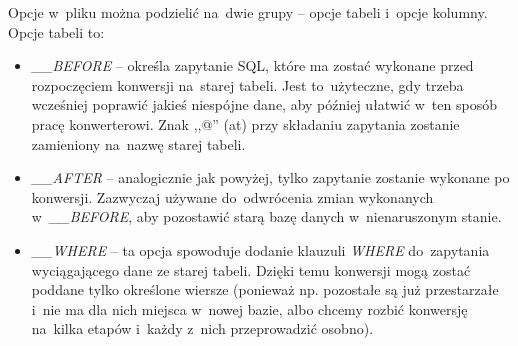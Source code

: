 \documentclass[a4paper,12pt,oneside]{report}
\begin{document}
Opcje w~pliku można podzielić na~dwie grupy -- opcje tabeli i~opcje kolumny. Opcje tabeli to:
\begin{itemize}
  \item \emph{\_\_BEFORE} -- określa zapytanie SQL, które ma zostać wykonane przed rozpoczęciem konwersji na~starej tabeli. Jest to~użyteczne, gdy trzeba wcześniej poprawić jakieś niespójne dane, aby później ułatwić w~ten sposób pracę konwerterowi. Znak ,,@'' (at) przy składaniu zapytania zostanie zamieniony na~nazwę starej tabeli.
  \item \emph{\_\_AFTER} -- analogicznie jak powyżej, tylko zapytanie zostanie wykonane po konwersji. Zazwyczaj używane do~odwrócenia zmian wykonanych w~\emph{\_\_BEFORE}, aby pozostawić starą bazę danych w~nienaruszonym stanie.
  \item \emph{\_\_WHERE} -- ta opcja spowoduje dodanie klauzuli \emph{WHERE} do~zapytania wyciągającego dane ze starej tabeli. Dzięki temu konwersji mogą zostać poddane tylko określone wiersze (ponieważ np. pozostałe są już przestarzałe i~nie ma dla nich miejsca w~nowej bazie, albo chcemy rozbić konwersję na~kilka etapów i~każdy z~nich przeprowadzić osobno).
\end{itemize}
\end{document}
